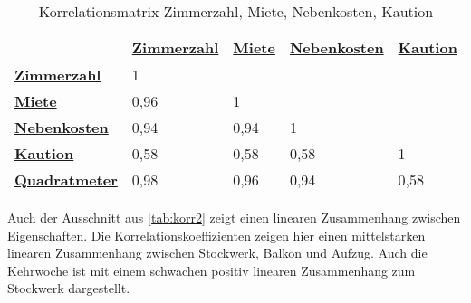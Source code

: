 \useunder{\uline}{\ul}{}
\begin{table}[h]
    \begin{center}
        \begin{tabular}{|l|l|l|l|l|}
            \hline
            {\ul \textbf{}}             & {\ul \textbf{Zimmerzahl}} & {\ul \textbf{Miete}} & {\ul \textbf{Nebenkosten}} & {\ul \textbf{Kaution}} \\ \hline
            {\ul \textbf{Zimmerzahl}}   & 1                         &                      &                            &                        \\ \hline
            {\ul \textbf{Miete}}        & 0,96                      & 1                    &                            &                        \\ \hline
            {\ul \textbf{Nebenkosten}}  & 0,94                      & 0,94                 & 1                          &                        \\ \hline
            {\ul \textbf{Kaution}}      & 0,58                      & 0,58                 & 0,58                       & 1                      \\ \hline
            {\ul \textbf{Quadratmeter}} & 0,98                      & 0,96                 & 0,94                       & 0,58                   \\ \hline
        \end{tabular}
        \caption{Korrelationsmatrix Zimmerzahl, Miete, Nebenkosten, Kaution}
        \label{tab:korr1}
    \end{center}
\end{table}

Auch der Ausschnitt aus \autoref{tab:korr2} zeigt einen linearen Zusammenhang zwischen Eigenschaften. Die Korrelationskoeffizienten 
zeigen hier einen mittelstarken linearen Zusammenhang zwischen Stockwerk, Balkon und Aufzug. 
Auch die Kehrwoche ist mit einem schwachen positiv linearen Zusammenhang zum Stockwerk dargestellt. 

